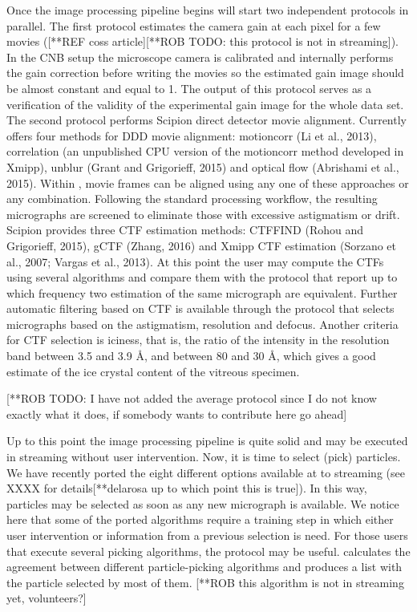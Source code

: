 Once the image processing pipeline begins \scipionbox will start two independent protocols in parallel. The first protocol estimates the camera gain at each pixel for a few  movies ([**REF coss article][**ROB TODO: this protocol is not in streaming]). In the CNB setup the microscope camera is calibrated and internally performs the gain correction before writing the movies so the estimated gain image should be almost constant and equal to 1. The output of this protocol serves as a verification of the validity of the experimental gain image for the whole data set. The second protocol performs Scipion direct detector movie alignment. Currently \scipionbox offers  four  methods  for  DDD  movie  alignment: motioncorr (Li et al., 2013),
correlation (an unpublished CPU version of the motioncorr method developed in Xmipp),
unblur (Grant and Grigorieff, 2015) and optical flow (Abrishami et al., 2015). Within \scipionbox, movie frames can be aligned using any one of these approaches or any combination. Following the standard processing workflow, the resulting micrographs are screened to eliminate those with excessive astigmatism or drift. Scipion provides three CTF estimation methods:
CTFFIND (Rohou and Grigorieff, 2015), gCTF (Zhang, 2016) and Xmipp CTF estimation (Sorzano et al., 2007; Vargas et al., 2013). At this point the user may compute the CTFs using several algorithms and compare them with the protocol  that report up to which frequency two estimation of the same micrograph are equivalent. Further automatic filtering based on CTF is available through the protocol  that selects micrographs based on the astigmatism, resolution and defocus. Another criteria for CTF selection is iciness, that is,  the ratio of the intensity in the resolution band between 3.5 and 3.9 \AA, and between 80 and 30 \AA, which gives a good estimate of the ice crystal content of the vitreous specimen.

[**ROB TODO: I have not added the average protocol since I do not know exactly what it does, if somebody wants to contribute here go ahead]

Up to this point the image processing pipeline is quite solid and may be executed in streaming without user intervention. Now, it is time to select (pick) particles. We have recently ported the eight different options available at \scipion  to streaming (see XXXX for details[**delarosa up to which point this is true]). In this way,  particles may be selected as soon as any new micrograph is available. We notice here that some of the ported algorithms require a training step in which either user intervention or information from a previous selection is need. For those users that execute several picking algorithms, the protocol  may be useful.   calculates the agreement between different particle-picking algorithms and produces a list with the particle selected by most of them. [**ROB this algorithm is not in streaming yet, volunteers?]

